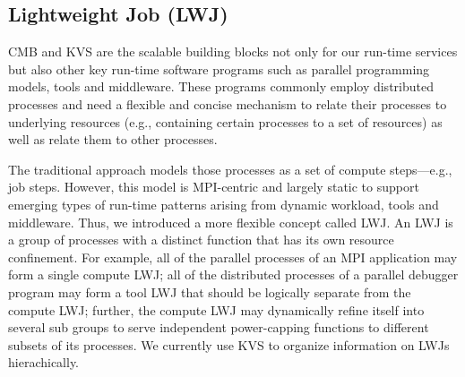 \subsection{Lightweight Job (LWJ)}
CMB and KVS are the scalable building blocks not only for our run-time services 
but also other key run-time software programs such as parallel programming models, 
tools and middleware. These programs commonly employ distributed processes and need a 
flexible and concise mechanism to relate their processes to underlying resources 
(e.g., containing certain processes to a set of resources) as well as relate 
them to other processes. 

The traditional approach models those processes as
a set of compute steps---e.g., job steps. However, this model 
is MPI-centric and largely static to support emerging types
of run-time patterns arising from dynamic workload, tools and middleware.
Thus, we introduced a more flexible concept called LWJ.
An LWJ is a group
of processes with a distinct function that has its own resource confinement. 
For example, all of the parallel
processes of an MPI application may form a single compute LWJ; all of the distributed processes
of a parallel debugger program may form a tool LWJ that should be logically separate from the
compute LWJ; further, the compute LWJ may dynamically refine itself into several 
sub groups to serve independent power-capping functions to different subsets of its processes.
We currently use KVS to organize information on LWJs hierachically.
